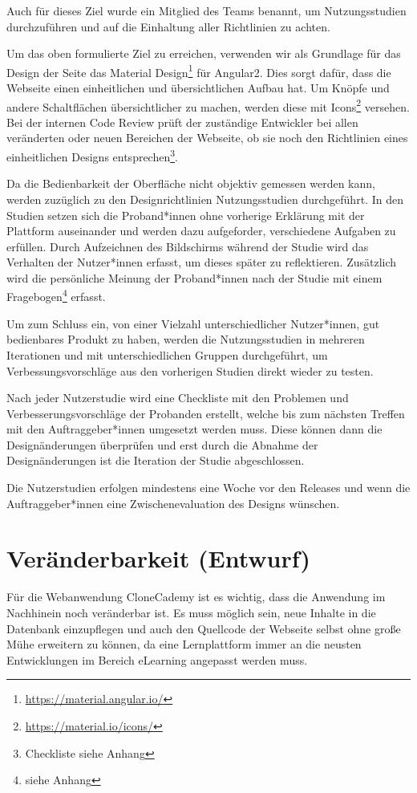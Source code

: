 \documentclass[accentcolor=tud0b,12pt,paper=a4]{tudreport}
\begin{document}
Auch für dieses Ziel wurde ein Mitglied des Teams benannt, um Nutzungsstudien durchzuführen und auf die Einhaltung aller Richtlinien zu achten.

Um das oben formulierte Ziel zu erreichen, verwenden wir als Grundlage für das Design der Seite das Material Design\footnote{\href{https://material.angular.io/}{https://material.angular.io/}} für Angular2. Dies sorgt dafür, dass die Webseite einen einheitlichen und übersichtlichen Aufbau hat. Um Knöpfe und andere Schaltflächen übersichtlicher zu machen, werden diese mit Icons\footnote{\href{https://material.io/icons/}{https://material.io/icons/}} versehen. Bei der internen Code Review prüft der zuständige Entwickler bei allen veränderten oder neuen Bereichen der Webseite, ob sie noch den Richtlinien eines einheitlichen Designs entsprechen\footnote{Checkliste siehe Anhang}.

Da die Bedienbarkeit der Oberfläche nicht objektiv gemessen werden kann, werden zuzüglich zu den Designrichtlinien Nutzungsstudien durchgeführt. In den Studien setzen sich die Proband*innen ohne vorherige Erklärung mit der Plattform auseinander und werden dazu aufgeforder, verschiedene Aufgaben zu erfüllen. Durch Aufzeichnen des Bildschirms während der Studie wird das Verhalten der Nutzer*innen erfasst, um dieses später zu reflektieren. Zusätzlich wird die persönliche Meinung der Proband*innen nach der Studie mit einem Fragebogen\footnote{siehe Anhang} erfasst.

Um zum Schluss ein, von einer Vielzahl unterschiedlicher Nutzer*innen, gut bedienbares Produkt zu haben, werden die Nutzungsstudien in mehreren Iterationen und mit unterschiedlichen Gruppen durchgeführt, um Verbessungsvorschläge aus den vorherigen Studien direkt wieder zu testen. 

Nach jeder Nutzerstudie wird eine Checkliste mit den Problemen und Verbesserungsvorschläge der Probanden erstellt, welche bis zum nächsten Treffen mit den Auftraggeber*innen umgesetzt werden muss. Diese können dann die Designänderungen überprüfen und erst durch die Abnahme der Designänderungen ist die Iteration der Studie abgeschlossen.

Die Nutzerstudien erfolgen mindestens eine Woche vor den Releases und wenn die Auftraggeber*innen eine Zwischenevaluation des Designs wünschen.

\section{Veränderbarkeit (Entwurf)}
Für die Webanwendung CloneCademy ist es wichtig, dass die Anwendung im Nachhinein noch veränderbar ist. Es muss möglich sein, neue Inhalte in die Datenbank einzupflegen und auch den Quellcode der Webseite selbst ohne große Mühe erweitern zu können, da eine Lernplattform immer an die neusten Entwicklungen im Bereich eLearning angepasst werden muss.
\end{document}
